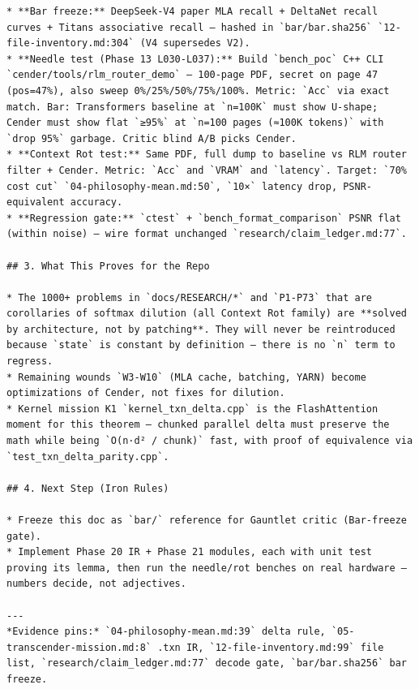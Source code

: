 \begin{verbatim}
* **Bar freeze:** DeepSeek-V4 paper MLA recall + DeltaNet recall curves + Titans associative recall — hashed in `bar/bar.sha256` `12-file-inventory.md:304` (V4 supersedes V2).
* **Needle test (Phase 13 L030-L037):** Build `bench_poc` C++ CLI `cender/tools/rlm_router_demo` — 100-page PDF, secret on page 47 (pos=47%), also sweep 0%/25%/50%/75%/100%. Metric: `Acc` via exact match. Bar: Transformers baseline at `n=100K` must show U-shape; Cender must show flat `≥95%` at `n=100 pages (≈100K tokens)` with `drop 95%` garbage. Critic blind A/B picks Cender.
* **Context Rot test:** Same PDF, full dump to baseline vs RLM router filter + Cender. Metric: `Acc` and `VRAM` and `latency`. Target: `70% cost cut` `04-philosophy-mean.md:50`, `10×` latency drop, PSNR-equivalent accuracy.
* **Regression gate:** `ctest` + `bench_format_comparison` PSNR flat (within noise) — wire format unchanged `research/claim_ledger.md:77`.

## 3. What This Proves for the Repo

* The 1000+ problems in `docs/RESEARCH/*` and `P1-P73` that are corollaries of softmax dilution (all Context Rot family) are **solved by architecture, not by patching**. They will never be reintroduced because `state` is constant by definition — there is no `n` term to regress.
* Remaining wounds `W3-W10` (MLA cache, batching, YARN) become optimizations of Cender, not fixes for dilution.
* Kernel mission K1 `kernel_txn_delta.cpp` is the FlashAttention moment for this theorem — chunked parallel delta must preserve the math while being `O(n·d² / chunk)` fast, with proof of equivalence via `test_txn_delta_parity.cpp`.

## 4. Next Step (Iron Rules)

* Freeze this doc as `bar/` reference for Gauntlet critic (Bar-freeze gate).
* Implement Phase 20 IR + Phase 21 modules, each with unit test proving its lemma, then run the needle/rot benches on real hardware — numbers decide, not adjectives.

---
*Evidence pins:* `04-philosophy-mean.md:39` delta rule, `05-transcender-mission.md:8` .txn IR, `12-file-inventory.md:99` file list, `research/claim_ledger.md:77` decode gate, `bar/bar.sha256` bar freeze.
\end{verbatim}


